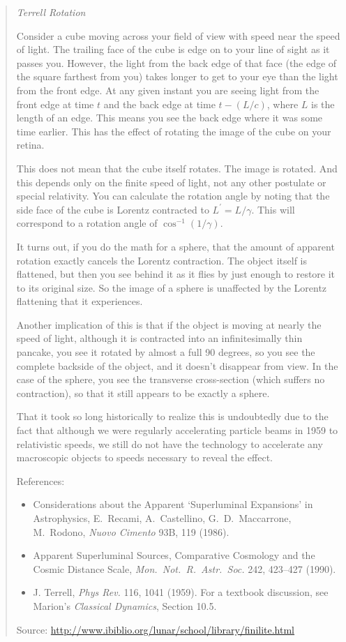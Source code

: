 \documentclass[a4paper]{article}
\begin{document}
\medskip
\begin{quote}
	{\it Terrell Rotation}

	Consider a cube moving across your field of view with speed near
	the speed of light. The trailing face of the cube is edge on to
	your line of sight as it passes you. However, the light from the
	back edge of that face (the edge of the square farthest from you)
	takes longer to get to your eye than the light from the front
	edge. At any given instant you are seeing light from the front
	edge at time $t$ and the back edge at time $t-(L/c)$, where $L$
	is the length of an edge. This means you see the back edge where
	it was some time earlier. This has the effect of rotating the
	image of the cube on your retina.

	This does not mean that the cube itself rotates. The image is
	rotated. And this depends only on the finite speed of light,
	not any other postulate or special relativity. You can calculate
	the rotation angle by noting that the side face of the cube is
	Lorentz contracted to $L^\prime = L / \gamma$.  This will
	correspond to a rotation angle of $\cos^{-1}(1 / \gamma)$.

	It turns out, if you do the math for a sphere, that the amount
	of apparent rotation exactly cancels the Lorentz contraction.
	The object itself is flattened, but then you see behind it as
	it flies by just enough to restore it to its original size. So
	the image of a sphere is unaffected by the Lorentz flattening
	that it experiences.

	Another implication of this is that if the object is moving at
	nearly the speed of light, although it is contracted into an
	infinitesimally thin pancake, you see it rotated by almost a
	full 90 degrees, so you see the complete backside of the object,
	and it doesn't disappear from view. In the case of the sphere,
	you see the transverse cross-section (which suffers no
	contraction), so that it still appears to be exactly a sphere.

	That it took so long historically to realize this is undoubtedly
	due to the fact that although we were regularly accelerating
	particle beams in 1959 to relativistic speeds, we still do not
	have the technology to accelerate any macroscopic objects to
	speeds necessary to reveal the effect.

	References:

	\begin{itemize}
		\item  Considerations about the Apparent `Superluminal
			Expansions' in Astrophysics, E.~Recami, A.~Castellino,
			G.~D.~Maccarrone, M.~Rodono, {\it Nuovo Cimento} 93B,
			119 (1986).
		\item Apparent Superluminal Sources, Comparative Cosmology
			and the Cosmic Distance Scale,
			{\it Mon.\ Not.\ R.\ Astr.\ Soc.} 242, 423--427 (1990).
		\item J. Terrell, {\it Phys Rev.} 116, 1041 (1959). For a
			textbook discussion, see Marion's {\it Classical
			Dynamics}, Section 10.5. 
	\end{itemize}

	Source: \url{http://www.ibiblio.org/lunar/school/library/finilite.html}
\end{quote}
\end{document}
